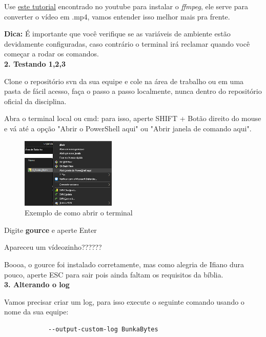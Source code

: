 Use \href{https://www.youtube.com/watch?v=WMEyeu1FKhw}{este tutorial} encontrado no \gls{youtube} para instalar o \textit{ffmpeg}, ele serve para converter o vídeo em .mp4, vamos entender isso melhor mais pra frente.

\textbf{Dica:} É importante que você verifique se as variáveis de ambiente estão devidamente configuradas, caso contrário o terminal irá reclamar quando você começar a rodar os comandos.\\

\textbf{2. Testando 1,2,3}

Clone o repositório \acs{svn} da sua equipe e cole na área de trabalho ou em uma pasta de fácil acesso, faça o passo a passo localmente, nunca dentro do repositório oficial da disciplina.

Abra o terminal local ou cmd: para isso, aperte SHIFT + Botão direito do mouse e vá até a opção "Abrir o PowerShell aqui" ou "Abrir janela de comando aqui".

\begin{figure}[htb]
        \centering
        \caption{Exemplo de como abrir o terminal}
        \includegraphics[width=0.4\textwidth]{anexos/Imagens_Blog/exemplo_abrir_terminal.png}
        \end{figure}
        \FloatBarrier

Digite \textbf{gource} e aperte Enter

Apareceu um vídeozinho?????? 

Boooa, o \gls{gource} foi instalado corretamente, mas como alegria de Ifiano dura pouco, aperte ESC para sair pois ainda faltam os requisitos da bíblia.\\

\textbf{3. Alterando o log}

Vamos precisar criar um log, para isso execute o seguinte comando usando o nome da sua equipe:
\lstset{language=Fortran,
             basicstyle=\ttfamily\small,
             showstringspaces=false
    }
        \begin{lstlisting} 
            --output-custom-log BunkaBytes
        \end{lstlisting}
        
